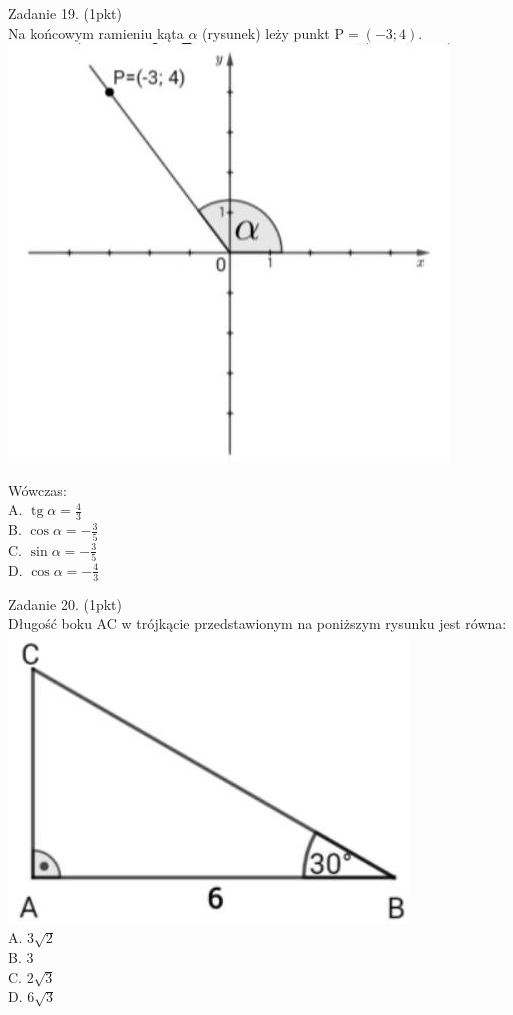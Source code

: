 \documentclass[10pt]{article}
\begin{document}
Zadanie 19. (1pkt)\\
Na końcowym ramieniu kąta \(\alpha\) (rysunek) leży punkt \(\mathrm{P}=(-3 ; 4)\).\\
\includegraphics[max width=\textwidth, center]{2024_11_21_55bf50695fa934dbe20eg-06}

Wówczas:\\
A. \(\operatorname{tg} \alpha=\frac{4}{3}\)\\
B. \(\cos \alpha=-\frac{3}{5}\)\\
C. \(\sin \alpha=-\frac{3}{5}\)\\
D. \(\cos \alpha=-\frac{4}{3}\)

Zadanie 20. (1pkt)\\
Długość boku AC w trójkącie przedstawionym na poniższym rysunku jest równa:\\
\includegraphics[max width=\textwidth, center]{2024_11_21_55bf50695fa934dbe20eg-06(1)}\\
A. \(3 \sqrt{2}\)\\
B. 3\\
C. \(2 \sqrt{3}\)\\
D. \(6 \sqrt{3}\)
\end{document}
